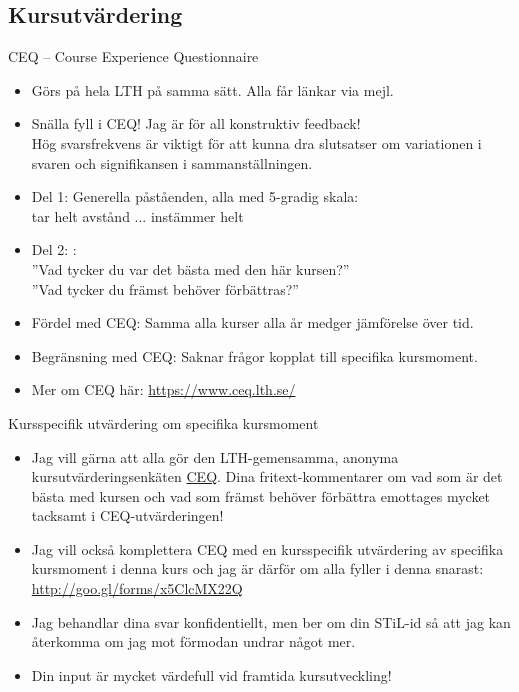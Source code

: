 \documentclass{lecturenotes}
\begin{document}
\subsection{Kursutvärdering}
\begin{Slide}{CEQ -- Course Experience Questionnaire}\footnotesize
\begin{itemize}
\item Görs på hela LTH på samma sätt. Alla får länkar via mejl.
\item Snälla fyll i CEQ! Jag är  för all konstruktiv feedback! \\ Hög svarsfrekvens är viktigt för att kunna dra slutsatser om variationen i svaren och signifikansen i sammanställningen.
\item Del 1: Generella påståenden, alla med 5-gradig skala: \\ tar helt avstånd ... instämmer helt
\item Del 2: : \\
''Vad  tycker  du  var  det  bästa  med  den här  kursen?'' \\
''Vad  tycker  du  främst  behöver  förbättras?''
\item Fördel med CEQ: Samma alla kurser alla år medger jämförelse över tid.
\item Begränsning med CEQ: Saknar frågor kopplat till specifika kursmoment.
\item Mer om CEQ här: \url{https://www.ceq.lth.se/}
\end{itemize}
\end{Slide}

\begin{Slide}{Kursspecifik utvärdering om specifika kursmoment}
\begin{itemize}
\item Jag vill gärna att alla gör den LTH-gemensamma, anonyma kursutvärderingsenkäten \href{https://www.ceq.lth.se/}{CEQ}. Dina fritext-kommentarer om vad som är det bästa med kursen och vad som främst behöver förbättra emottages mycket tacksamt i CEQ-utvärderingen!
\item Jag vill också komplettera CEQ med en kursspecifik utvärdering av specifika kursmoment i denna kurs och jag är därför  om alla fyller i denna snarast: \\ \url{http://goo.gl/forms/x5ClcMX22Q}
\item Jag behandlar dina svar konfidentiellt, men ber om din STiL-id så att jag kan återkomma om jag mot förmodan undrar något mer.
\item Din input är mycket värdefull vid framtida kursutveckling!
\end{itemize}
\end{Slide}
\end{document}
